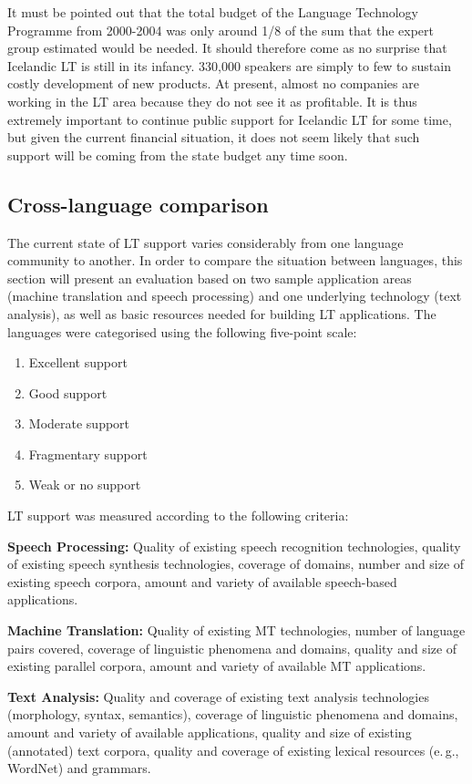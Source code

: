 \documentclass{../../metanetpaper}
\begin{document}
\begin{multicols}{2}
It must be pointed out that the total budget of the Language Technology Programme from 2000-2004 was only around 1/8 of the sum that the expert group estimated would be needed\cite{ilrt1}.  It should therefore come as no surprise that Icelandic LT is still in its infancy. 330,000 speakers are simply to few to sustain costly development of new products. At present, almost no companies are working in the LT area because they do not see it as profitable. It is thus extremely important to continue public support for Icelandic LT for some time, but given the current financial situation, it does not seem likely that such support will be coming from the state budget any time soon.

\subsection{Cross-language comparison}
The current state of LT support varies considerably from one language community to another. In order to compare the situation between languages, this section will present an evaluation based on two sample application areas (machine translation and speech processing) and one underlying technology (text analysis), as well as basic resources needed for building LT applications. The languages were categorised using the following five-point scale: 

\begin{enumerate}
\item Excellent support
\item Good support
\item Moderate support
\item Fragmentary support
\item Weak or no support
\end{enumerate}

LT support was measured according to the following criteria:

\textbf{Speech Processing:} Quality of existing speech recognition technologies, quality of existing speech synthesis technologies, coverage of domains, number and size of existing speech corpora, amount and variety of available speech-based applications.

\textbf{Machine Translation:} Quality of existing MT technologies, number of language pairs covered, coverage of linguistic phenomena and domains, quality and size of existing parallel corpora, amount and variety of available MT applications.

\textbf{Text Analysis:} Quality and coverage of existing text analysis technologies (morphology, syntax, semantics), coverage of linguistic phenomena and domains, amount and variety of available applications, quality and size of existing (annotated) text corpora, quality and coverage of existing lexical resources (e.\,g., WordNet) and grammars.


\end{multicols}
\end{document}
